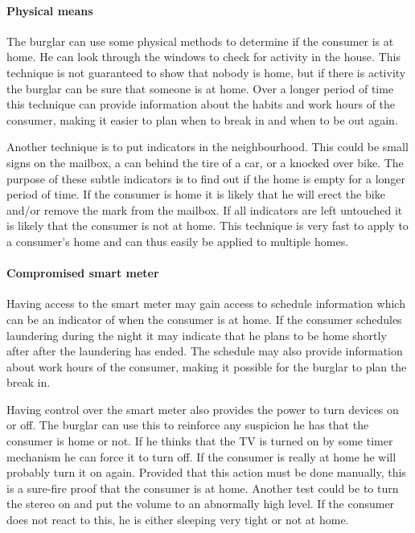 \paragraph{Physical means}
The burglar can use some physical methods to determine if the consumer is at home.
He can look through the windows to check for activity in the house.	
This technique is not guaranteed to show that nobody is home, but if there is activity the burglar can be sure that someone is at home.
Over a longer period of time this technique can provide information about the habits and work hours of the consumer, making it easier to plan when to break in and when to be out again.

Another technique is to put indicators in the neighbourhood.
This could be small signs on the mailbox, a can behind the tire of a car, or a knocked over bike.
The purpose of these subtle indicators is to find out if the home is empty for a longer period of time.
If the consumer is home it is likely that he will erect the bike and/or remove the mark from the mailbox.
If all indicators are left untouched it is likely that the consumer is not at home.
This technique is very fast to apply to a consumer's home and can thus easily be applied to multiple homes.

\paragraph{Compromised smart meter}
Having access to the smart meter may gain access to schedule information which can be an indicator of when the consumer is at home.
If the consumer schedules laundering during the night it may indicate that he plans to be home shortly after after the laundering has ended.
The schedule may also provide information about work hours of the consumer, making it possible for the burglar to plan the break in.

Having control over the smart meter also provides the power to turn devices on or off.
The burglar can use this to reinforce any suspicion he has that the consumer is home or not.
If he thinks that the TV is turned on by some timer mechanism he can force it to turn off.
If the consumer is really at home he will probably turn it on again.
Provided that this action must be done manually, this is a sure-fire proof that the consumer is at home.
Another test could be to turn the stereo on and put the volume to an abnormally high level.
If the consumer does not react to this, he is either sleeping very tight or not at home.


